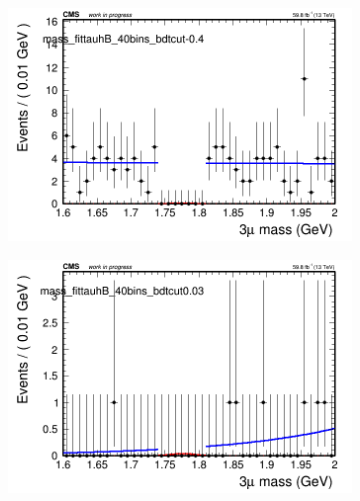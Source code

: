 \begin{figure}[H]
\begin{subfigure}{0.2\textwidth}
        \caption{}
    \end{subfigure}
    \begin{subfigure}{0.2\textwidth}
        \includegraphics[width=\textwidth]{unfixed_exp/plots/tauhB/massfit_tauhB_40bins_bdtcut-0.4.png}
        \caption{}
    \end{subfigure}
    \begin{subfigure}{0.2\textwidth}
        \includegraphics[width=\textwidth]{unfixed_exp/plots/tauhB/massfit_tauhB_40bins_bdtcut0.03.png}
        \caption{}
    \end{subfigure}
    \begin{subfigure}{0.2\textwidth}

\end{subfigure}
\end{figure}
